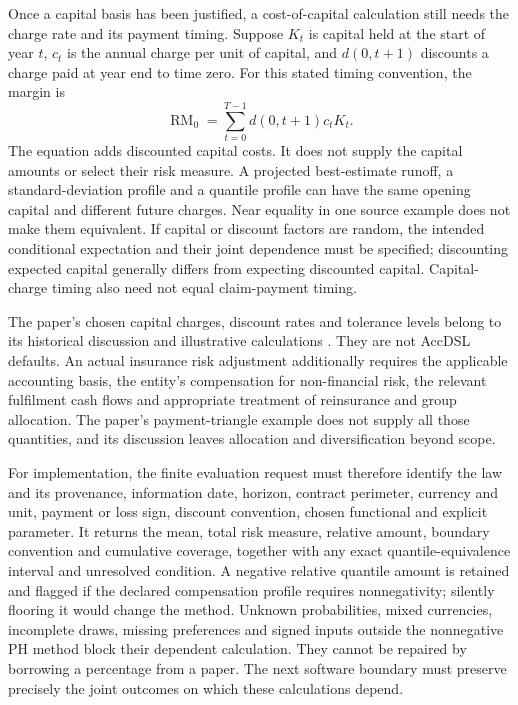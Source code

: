 Once a capital basis has been justified, a cost-of-capital calculation still
needs the charge rate and its payment timing. Suppose $K_t$ is capital held
at the start of year $t$, $c_t$ is the annual charge per unit of capital, and
$d(0,t+1)$ discounts a charge paid at year end to time zero. For this stated
timing convention, the margin is
\[
 \operatorname{RM}_0=\sum_{t=0}^{T-1}d(0,t+1)c_tK_t.
\]
The equation adds discounted capital costs. It does not supply the capital
amounts or select their risk measure. A projected best-estimate runoff,
a standard-deviation profile and a quantile profile can have the same
opening capital and different future charges. Near equality in one source
example does not make them equivalent. If capital or discount factors are
random, the intended conditional expectation and their joint dependence
must be specified; discounting expected capital generally differs from
expecting discounted capital. Capital-charge timing also need not equal
claim-payment timing.

The paper's chosen capital charges, discount rates and tolerance levels
belong to its historical discussion and illustrative calculations
\citep[Sections 5--7]{england2019lifetime}. They are not AccDSL defaults.
An actual insurance risk adjustment additionally requires the applicable
accounting basis, the entity's compensation for non-financial risk, the
relevant fulfilment cash flows and appropriate treatment of reinsurance
and group allocation. The paper's payment-triangle example does not supply
all those quantities, and its discussion leaves allocation and diversification
beyond scope.

For implementation, the finite evaluation request must therefore identify
the law and its provenance, information date, horizon, contract perimeter,
currency and unit, payment or loss sign, discount convention, chosen
functional and explicit parameter. It returns the mean, total risk measure,
relative amount, boundary convention and cumulative coverage, together with
any exact quantile-equivalence interval and unresolved condition. A negative
relative quantile amount is retained and flagged if the declared compensation
profile requires nonnegativity; silently flooring it would change the method.
Unknown probabilities, mixed currencies, incomplete draws, missing preferences
and signed inputs outside the nonnegative PH method block their dependent
calculation. They cannot be repaired by borrowing a percentage from a paper.
The next software boundary must preserve precisely the joint outcomes on
which these calculations depend.
